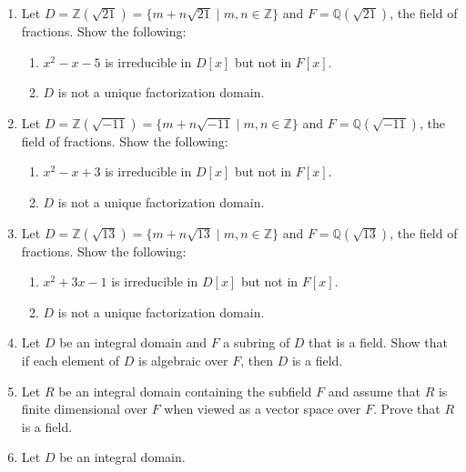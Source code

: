 \documentclass{article}
\theoremstyle{definition}
\newcommand{\Z}{\mathbb{Z}}
\newcommand{\Q}{\mathbb{Q}}
\begin{document}
\begin{enumerate}
            \item Let $D=\Z(\sqrt{21})=\{m+n\sqrt{21}\mid m,n\in \Z\}$ and $F=\Q(\sqrt{21})$, the field of fractions. Show the following:
            
            \begin{enumerate}
                \item $x^2-x-5$ is irreducible in $D[x]$ but not in $F[x]$.
                \item $D$ is not a unique factorization domain.
            \end{enumerate}

            \item Let $D=\Z(\sqrt{-11})=\{m+n\sqrt{-11}\mid m,n\in \Z\}$ and $F=\Q(\sqrt{-11})$, the field of fractions. Show the following:
            
            \begin{enumerate}
                \item $x^2-x+3$ is irreducible in $D[x]$ but not in $F[x]$.
                \item $D$ is not a unique factorization domain.
            \end{enumerate}

            \item Let $D=\Z(\sqrt{13})=\{m+n\sqrt{13}\mid m,n\in \Z\}$ and $F=\Q(\sqrt{13})$, the field of fractions. Show the following:
            
            \begin{enumerate}
                \item $x^2+3x-1$ is irreducible in $D[x]$ but not in $F[x]$.
                \item $D$ is not a unique factorization domain.
            \end{enumerate}

            \item Let $D$ be an integral domain and $F$ a subring of $D$ that is a field. Show that if each element of $D$ is algebraic over $F$, then $D$ is a field.
            
            \item Let $R$ be an integral domain containing the subfield $F$ and assume that $R$ is finite dimensional over $F$ when viewed as a vector space over $F$. Prove that $R$ is a field. 
            
            \item Let $D$ be an integral domain.
            

\end{enumerate}
\end{document}
